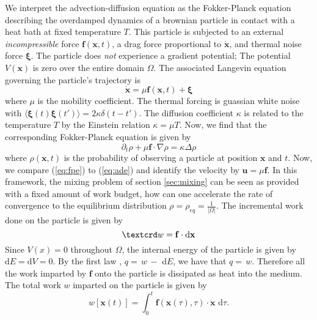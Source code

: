 \documentclass[12pt]{article}
\begin{document}
We interpret the advection-diffusion equation as the Fokker-Planck equation describing the overdamped dynamics of a brownian particle in contact with a heat bath at fixed temperature $T$. This particle is subjected to an external {\it incompressible} force $\mathbf{f}(\mathbf{x},t)$, a drag force proportional to $\dot{\mathbf{x}}$, and thermal noise force $\mathbf{\xi}$.  The particle does {\it not} experience a gradient potential; The potential $V(\mathbf{x})$ is zero over the entire domain $\Omega$.  The associated Langevin equation governing the particle's trajectory is 
\begin{equation}
\dot{\mathbf{x}} = \mu \mathbf{f}(\mathbf{x},t) + \mathbf{\xi}
\end{equation}
where $\mu$ is the mobility coefficient. The thermal forcing is guassian white noise with $\langle \mathbf{\xi}(t)\mathbf{\xi}(t') \rangle = 2\kappa\delta ( t- t')$.  The diffusion coefficient $\kappa$ is related to the temperature $T$ by the Einstein relation $\kappa = \mu T$.
Now, we find that the corresponding Fokker-Planck equation is given by 
\begin{equation}
\label{eq:fpe}
\partial_t \rho + \mu\mathbf{f}\cdot \nabla \rho =  \kappa\Delta \rho
\end{equation}
where $\rho(\mathbf{x},t)$ is the probability of observing a particle at position $\mathbf{x}$ and $t$. Now, we compare (\ref{eq:fpe}) to (\ref{eq:ade}) and identify the velocity by $\mathbf{u}=\mu \mathbf{f}$.  In this framework, the mixing problem of section \ref{sec:mixing} can be seen as provided with a fixed amount of work budget, how can one accelerate the rate of convergence to the equilibrium distribution $\rho=\rho_{eq}=\frac{1}{|\Omega|}$.  The incremental work done on the particle is given by 
\begin{equation}
\text{\textcrd}w=\mathbf{f}\cdot \text{d}\mathbf{x}
\end{equation}
Since $V(x)=0$ throughout $\Omega$, the internal energy of the particle is given by $\text{d}E=\text{d}V=0$. By the first law \cite{Sekimoto1998}, \textcrd $q =\, $\textcrd$w   \,- $ d$E $,  we have that  \textcrd $q  =\,  $\textcrd$w$. Therefore all the work imparted by $\mathbf{f}$ onto the particle is dissipated as heat into the medium. The total work $w$ imparted on the particle is given by \cite{Seifert2012a}
\begin{equation}
\label{eq:work}
w[\mathbf{x}(t)]=\int_0^t \mathbf{f}(\mathbf{x}(\tau),\tau)\cdot \dot{\mathbf{x}}\,\, \text{d}\tau.
\end{equation} 
\end{document}
